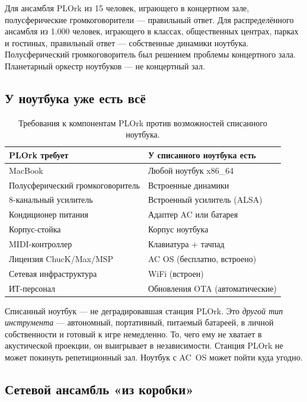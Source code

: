 \documentclass[10pt,letterpaper,twocolumn]{article}
\begin{document}
Для ансамбля PLOrk из 15 человек, играющего в концертном зале, полусферические громкоговорители --- правильный ответ. Для распределённого ансамбля из 1.000 человек, играющего в классах, общественных центрах, парках и гостиных, правильный ответ --- собственные динамики ноутбука. Полусферический громкоговоритель был решением проблемы концертного зала. Планетарный оркестр ноутбуков --- не концертный зал.

\subsection{У ноутбука уже есть всё}

\begin{table}[h]
\small
\centering
\begin{tabular}{ll}
\toprule
\textbf{PLOrk требует} & \textbf{У списанного ноутбука есть} \\
\midrule
MacBook & Любой ноутбук x86\_64 \\
Полусферический громкоговоритель & Встроенные динамики \\
8-канальный усилитель & Встроенный усилитель (ALSA) \\
Кондиционер питания & Адаптер AC или батарея \\
Корпус-стойка & Корпус ноутбука \\
MIDI-контроллер & Клавиатура + тачпад \\
Лицензия ChucK/Max/MSP & AC OS (бесплатно, встроено) \\
Сетевая инфраструктура & WiFi (встроен) \\
ИТ-персонал & Обновления OTA (автоматические) \\
\bottomrule
\end{tabular}
\caption{Требования к компонентам PLOrk против возможностей списанного ноутбука.}
\label{tab:plork-vs-surplus}
\end{table}

Списанный ноутбук --- не деградировавшая станция PLOrk. Это \emph{другой тип инструмента} --- автономный, портативный, питаемый батареей, в личной собственности и готовый к игре немедленно. То, чего ему не хватает в акустической проекции, он выигрывает в независимости. Станция PLOrk не может покинуть репетиционный зал. Ноутбук с AC~OS может пойти куда угодно.

\subsection{Сетевой ансамбль «из коробки»}
\end{document}
